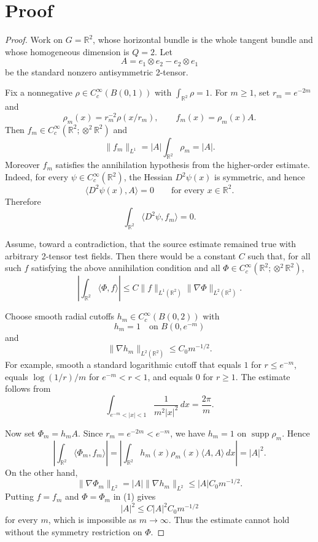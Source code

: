 \documentclass[11pt]{article}
\newcommand{\R}{\mathbb R}
\newcommand{\norm}[1]{\lVert #1\rVert}
\newcommand{\supp}{\operatorname{supp}}
\begin{document}
\section*{Proof}

\begin{proof}
Work on \(G=\R^2\), whose horizontal bundle is the whole tangent bundle and
whose homogeneous dimension is \(Q=2\).  Let
\[
  A=e_1\otimes e_2-e_2\otimes e_1
\]
be the standard nonzero antisymmetric 2-tensor.

Fix a nonnegative \(\rho\in C_c^\infty(B(0,1))\) with
\(\int_{\R^2}\rho=1\).  For \(m\ge1\), set \(r_m=e^{-2m}\) and
\[
  \rho_m(x)=r_m^{-2}\rho(x/r_m),\qquad f_m(x)=\rho_m(x)A .
\]
Then \(f_m\in C_c^\infty(\R^2;\otimes^2\R^2)\) and
\[
  \norm{f_m}_{L^1}=|A|\int_{\R^2}\rho_m=|A|.
\]
Moreover \(f_m\) satisfies the annihilation hypothesis from the higher-order
estimate.  Indeed, for every \(\psi\in C_c^\infty(\R^2)\), the Hessian
\(D^2\psi(x)\) is symmetric, and hence
\[
  \langle D^2\psi(x),A\rangle=0
  \qquad\text{for every }x\in\R^2.
\]
Therefore
\[
  \int_{\R^2}\langle D^2\psi,f_m\rangle=0.
\]

Assume, toward a contradiction, that the source estimate remained true with
arbitrary 2-tensor test fields.  Then there would be a constant \(C\) such
that, for all such \(f\) satisfying the above annihilation condition and all
\(\Phi\in C_c^\infty(\R^2;\otimes^2\R^2)\),
\[
  \left|\int_{\R^2}\langle \Phi,f\rangle\right|
  \le C\norm{f}_{L^1(\R^2)}\norm{\nabla\Phi}_{L^2(\R^2)}.
  \tag{1}
\]

Choose smooth radial cutoffs \(h_m\in C_c^\infty(B(0,2))\) with
\[
  h_m=1\quad\text{on }B(0,e^{-m})
\]
and
\[
  \norm{\nabla h_m}_{L^2(\R^2)}\le C_0m^{-1/2}.
\]
For example, smooth a standard logarithmic cutoff that equals
\(1\) for \(r\le e^{-m}\), equals \(\log(1/r)/m\) for
\(e^{-m}<r<1\), and equals \(0\) for \(r\ge1\).  The estimate follows from
\[
  \int_{e^{-m}<|x|<1}\frac{1}{m^2|x|^2}\,dx
  =\frac{2\pi}{m}.
\]

Now set \(\Phi_m=h_mA\).  Since \(r_m=e^{-2m}<e^{-m}\), we have
\(h_m=1\) on \(\supp\rho_m\).  Hence
\[
  \left|\int_{\R^2}\langle \Phi_m,f_m\rangle\right|
  =
  \left|\int_{\R^2} h_m(x)\rho_m(x)\langle A,A\rangle\,dx\right|
  =
  |A|^2.
\]
On the other hand,
\[
  \norm{\nabla\Phi_m}_{L^2}=|A|\norm{\nabla h_m}_{L^2}
  \le |A|C_0m^{-1/2}.
\]
Putting \(f=f_m\) and \(\Phi=\Phi_m\) in (1) gives
\[
  |A|^2
  \le C |A|^2 C_0m^{-1/2}
\]
for every \(m\), which is impossible as \(m\to\infty\).  Thus the estimate
cannot hold without the symmetry restriction on \(\Phi\).
\end{proof}
\end{document}
